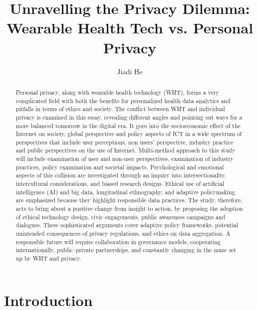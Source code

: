 \documentclass[11pt]{article}
\title{Unravelling the Privacy Dilemma: Wearable Health Tech vs. Personal Privacy}
\author{Jiadi He}
\affil{Harvard Kennedy School}
\begin{document}
\maketitle

\begin{abstract}
Personal privacy, along with wearable health technology (WHT), forms a very complicated field with both the benefits for personalized health data analytics and pitfalls in terms of ethics and society. The conflict between WHT and individual privacy is examined in this essay, revealing different angles and pointing out ways for a more balanced tomorrow in the digital era. It goes into the socioeconomic effect of the Internet on society, global perspective and policy aspects of ICT in a wide spectrum of perspectives that include user perceptions, non users’ perspective, industry practice and public perspectives on the use of Internet. Multi-method approach to this study will include examination of user and non-user perspectives, examination of industry practices, policy examination and societal impacts. Psychological and emotional aspects of this collision are investigated through an inquiry into intersectionality, intercultural considerations, and biased research designs. Ethical use of artificial intelligence (AI) and big data, longitudinal ethnography, and adaptive policymaking are emphasized because they highlight responsible data practices. The study, therefore, acts to bring about a positive change from insight to action, by proposing the adoption of ethical technology design, civic engagements, public awareness campaigns and dialogues. These sophisticated arguments cover adaptive policy frameworks, potential unintended consequences of privacy regulations, and ethics on data aggregation. A responsible future will require collaboration in governance models, cooperating internationally, public–private partnerships, and constantly changing in the maze set up by WHT and privacy.
\end{abstract}

\section{Introduction}
\end{document}
